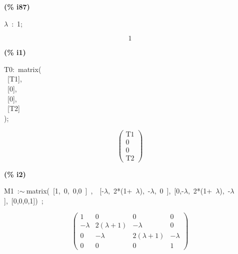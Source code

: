 \documentclass[fleqn]{article}
\begin{document}
\noindent
\begin{minipage}[t]{4.000000em}\color{red}\bfseries
(\% i87)	
\end{minipage}
\begin{minipage}[t]{\textwidth}\color{blue}
\ensuremath{\lambda}\ :\ 1;
\end{minipage}
\[\displaystyle \tag{\% o87} 
1\mbox{}
\]


\noindent
\begin{minipage}[t]{4.000000em}\color{red}\bfseries
(\% i1)	
\end{minipage}
\begin{minipage}[t]{\textwidth}\color{blue}
T0:\ matrix(\\
\ [T1],\ \\
\ [0],\ \\
\ [0],\ \\
\ [T2]\\
);
\end{minipage}
\[\displaystyle \tag{\% o1} 
\begin{pmatrix}\ensuremath{\mathrm{T1}}\\
0\\
0\\
\ensuremath{\mathrm{T2}}\end{pmatrix}\mbox{}
\]


\noindent
\begin{minipage}[t]{4.000000em}\color{red}\bfseries
(\% i2)	
\end{minipage}
\begin{minipage}[t]{\textwidth}\color{blue}
M1\ :\ensuremath{\sim\ }matrix(\ [1,\ 0,\ 0,0\ ]\ ,\ \ [-\ensuremath{\lambda},\ 2*(1+\ \ensuremath{\lambda}),\ -\ensuremath{\lambda},\ 0\ ],\ [0,-\ensuremath{\lambda},\ 2*(1+\ \ensuremath{\lambda}),\ -\ensuremath{\lambda}],\ [0,0,0,1])\ ;
\end{minipage}
\[\displaystyle \tag{\% o2} 
\begin{pmatrix}1 & 0 & 0 & 0\\
-\lambda  & 2 \left( \lambda +1\right)  & -\lambda  & 0\\
0 & -\lambda  & 2 \left( \lambda +1\right)  & -\lambda \\
0 & 0 & 0 & 1\end{pmatrix}\mbox{}
\]
\end{document}
